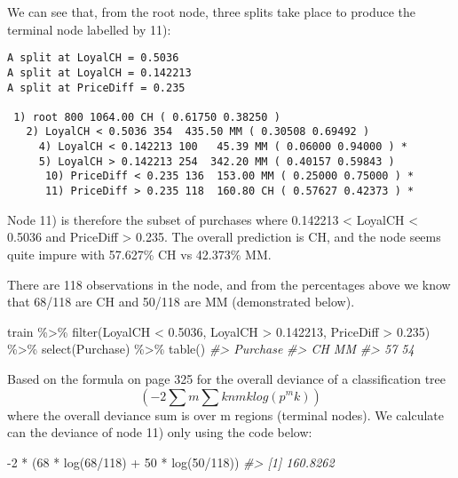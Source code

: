 \documentclass[
]{book}
\newenvironment{Shaded}{\begin{snugshade}}{\end{snugshade}}
\newcommand{\CommentTok}[1]{\textcolor[rgb]{0.56,0.35,0.01}{\textit{#1}}}
\newcommand{\DecValTok}[1]{\textcolor[rgb]{0.00,0.00,0.81}{#1}}
\newcommand{\FloatTok}[1]{\textcolor[rgb]{0.00,0.00,0.81}{#1}}
\newcommand{\FunctionTok}[1]{\textcolor[rgb]{0.00,0.00,0.00}{#1}}
\newcommand{\NormalTok}[1]{#1}
\newcommand{\SpecialCharTok}[1]{\textcolor[rgb]{0.00,0.00,0.00}{#1}}
\begin{document}
We can see that, from the root node, three splits take place to produce the terminal node labelled by 11):

\begin{verbatim}
A split at LoyalCH = 0.5036
A split at LoyalCH = 0.142213
A split at PriceDiff = 0.235

 1) root 800 1064.00 CH ( 0.61750 0.38250 )  
   2) LoyalCH < 0.5036 354  435.50 MM ( 0.30508 0.69492 )  
     4) LoyalCH < 0.142213 100   45.39 MM ( 0.06000 0.94000 ) *
     5) LoyalCH > 0.142213 254  342.20 MM ( 0.40157 0.59843 )  
      10) PriceDiff < 0.235 136  153.00 MM ( 0.25000 0.75000 ) *
      11) PriceDiff > 0.235 118  160.80 CH ( 0.57627 0.42373 ) *
\end{verbatim}

Node 11) is therefore the subset of purchases where 0.142213 \textless{} LoyalCH \textless{} 0.5036 and PriceDiff \textgreater{} 0.235. The overall prediction is CH, and the node seems quite impure with 57.627\% CH vs 42.373\% MM.

There are 118 observations in the node, and from the percentages above we know that 68/118 are CH and 50/118 are MM (demonstrated below).

\begin{Shaded}
\begin{Highlighting}[]
\NormalTok{train }\SpecialCharTok{\%\textgreater{}\%}
  \FunctionTok{filter}\NormalTok{(LoyalCH }\SpecialCharTok{\textless{}} \FloatTok{0.5036}\NormalTok{, }
\NormalTok{         LoyalCH }\SpecialCharTok{\textgreater{}} \FloatTok{0.142213}\NormalTok{, }
\NormalTok{         PriceDiff }\SpecialCharTok{\textgreater{}} \FloatTok{0.235}\NormalTok{) }\SpecialCharTok{\%\textgreater{}\%}
  \FunctionTok{select}\NormalTok{(Purchase) }\SpecialCharTok{\%\textgreater{}\%} 
  \FunctionTok{table}\NormalTok{()}
\CommentTok{\#\textgreater{} Purchase}
\CommentTok{\#\textgreater{} CH MM }
\CommentTok{\#\textgreater{} 57 54}
\end{Highlighting}
\end{Shaded}

Based on the formula on page 325 for the overall deviance of a classification tree \[ (−2∑m∑knmklog(p^mk))\] where the overall deviance sum is over m regions (terminal nodes). We calculate can the deviance of node 11) only using the code below:

\begin{Shaded}
\begin{Highlighting}[]
\SpecialCharTok{{-}}\DecValTok{2} \SpecialCharTok{*}\NormalTok{ (}\DecValTok{68} \SpecialCharTok{*} \FunctionTok{log}\NormalTok{(}\DecValTok{68}\SpecialCharTok{/}\DecValTok{118}\NormalTok{) }\SpecialCharTok{+} \DecValTok{50} \SpecialCharTok{*} \FunctionTok{log}\NormalTok{(}\DecValTok{50}\SpecialCharTok{/}\DecValTok{118}\NormalTok{))}
\CommentTok{\#\textgreater{} [1] 160.8262}
\end{Highlighting}
\end{Shaded}
\end{document}
